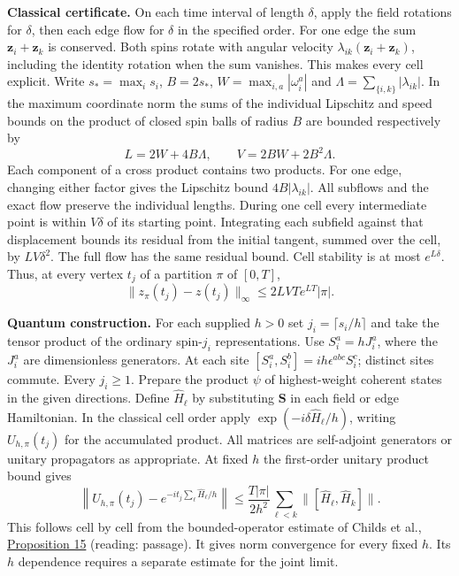 \documentclass[11pt,a4paper]{article}
\begin{document}
\textbf{Classical certificate.} On each time interval of length
\(\delta\), apply the field rotations for \(\delta\), then each edge
flow for \(\delta\) in the specified order. For one edge the sum
\(\mathbf z_i+\mathbf z_k\) is conserved. Both spins rotate with angular
velocity \(\lambda_{ik}(\mathbf z_i+\mathbf z_k)\), including the
identity rotation when the sum vanishes. This makes every cell explicit.
Write \(s_*=\max_i s_i\), \(B=2s_*\), \(W=\max_{i,a}|\omega_i^a|\) and
\(\Lambda=\sum_{\{i,k\}}|\lambda_{ik}|\). In the maximum coordinate norm
the sums of the individual Lipschitz and speed bounds on the product of
closed spin balls of radius \(B\) are bounded respectively by \[
 L=2W+4B\Lambda,\qquad V=2BW+2B^2\Lambda .
\] Each component of a cross product contains two products. For one
edge, changing either factor gives the Lipschitz bound
\(4B|\lambda_{ik}|\). All subflows and the exact flow preserve the
individual lengths. During one cell every intermediate point is within
\(V\delta\) of its starting point. Integrating each subfield against
that displacement bounds its residual from the initial tangent, summed
over the cell, by \(LV\delta^2\). The full flow has the same residual
bound. Cell stability is at most \(e^{L\delta}\). Thus, at every vertex
\(t_j\) of a partition \(\pi\) of \([0,T]\), \[
 \|z_\pi(t_j)-z(t_j)\|_\infty
 \le 2LVT e^{LT}|\pi|. \tag{23}
\]

\textbf{Quantum construction.} For each supplied \(h>0\) set
\(j_i=\lceil s_i/h\rceil\) and take the tensor product of the ordinary
spin-\(j_i\) representations. Use \(S_i^a=hJ_i^a\), where the \(J_i^a\)
are dimensionless generators. At each site
\([S_i^a,S_i^b]=ih\epsilon^{abc}S_i^c\); distinct sites commute. Every
\(j_i\ge1\). Prepare the product \(\psi\) of highest-weight coherent
states in the given directions. Define \(\widehat H_\ell\) by
substituting \(\mathbf S\) in each field or edge Hamiltonian. In the
classical cell order apply \(\exp(-i\delta\widehat H_\ell/h)\), writing
\(U_{h,\pi}(t_j)\) for the accumulated product. All matrices are
self-adjoint generators or unitary propagators as appropriate. At fixed
\(h\) the first-order unitary product bound gives \[
 \left\|U_{h,\pi}(t_j)-e^{-it_j\sum_\ell\widehat H_\ell/h}\right\|
 \le \frac{T|\pi|}{2h^2}
       \sum_{\ell<k}\|[\widehat H_\ell,\widehat H_k]\| . \tag{24}
\] This follows cell by cell from the bounded-operator estimate of
Childs et al., \href{https://arxiv.org/pdf/1912.08854}{Proposition 15}
(reading: passage). It gives norm convergence for every fixed \(h\). Its
\(h\) dependence requires a separate estimate for the joint limit.
\end{document}
